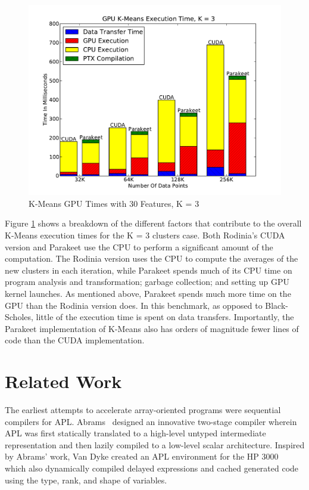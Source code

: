 \documentclass[10pt,twocolumn]{article}
\begin{document}
\begin{figure}
\includegraphics[scale=0.4]{KMGPU.pdf}
\caption{K-Means GPU Times with 30 Features, K = 3}
\label{KMGPU}
\end{figure}

Figure \ref{KMGPU} shows a breakdown of the different factors that contribute to the overall K-Means execution times for the K = 3 clusters case.  Both Rodinia's CUDA version and Parakeet use the CPU to perform a significant amount of the computation.  The Rodinia version uses the CPU to compute the averages of the new clusters in each iteration, while Parakeet spends much of its CPU time on program analysis and transformation; garbage collection; and setting up GPU kernel launches.  As mentioned above, Parakeet spends much more time on the GPU than the Rodinia version does. In this benchmark, as opposed to Black-Scholes, little of the execution time is spent on data transfers.  Importantly, the Parakeet implementation of K-Means also has orders of magnitude fewer lines of code than the CUDA implementation.

\section{Related Work}
\label{RelatedWork}
The earliest attempts to accelerate array-oriented programs were sequential compilers for APL. Abrams~\cite{Abrams70} designed an innovative two-stage compiler wherein APL was first statically translated to a high-level untyped intermediate representation and then lazily compiled to a low-level scalar architecture. Inspired by Abrams' work, Van Dyke created an APL environment for the HP 3000~\cite{VanDyke77} which also dynamically compiled delayed expressions and cached generated code using the type, rank, and shape of variables. 
\end{document}
